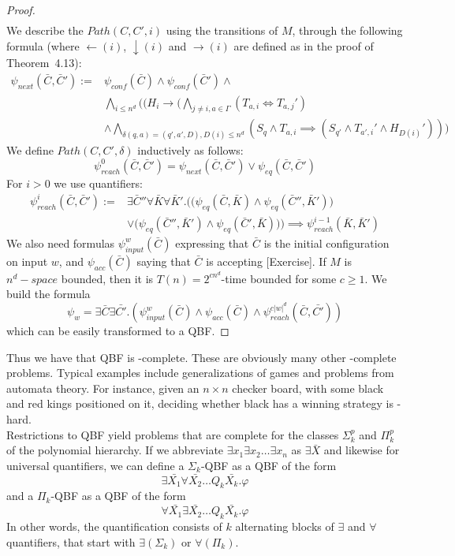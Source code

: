 \documentclass{report}
\newcommand{\PSpace}{\text{$\mathit{PSpace}$}\xspace}
\begin{document}
\begin{proof}
\begin{align*}
\end{align*}
We describe the $Path(C,C',i)$ using the transitions of $M$, through the following formula (where $\leftarrow(i)$, $\downarrow(i)$ and $\rightarrow(i)$ are defined as in the proof of Theorem~4.13):
\begin{align*}
 \psi_{\mathit{next}}(\bar{C}, \bar{C}') := {}& \psi_{\mathit{conf}}(\bar{C}) \land \psi_{\mathit{conf}}(\bar{C}') \land {} \\
 & \bigwedge_{i \leq n^d} \big( (H_i \to ( \bigwedge_{j \neq i, a \in \Gamma} ( T_{a,i} \iff T_{a,j}' ) \\
 & \land \bigwedge_{\delta(q,a) = (q',a',D), D(i) \leq n^d} ( S_q \land T_{a,i} \implies (S_{q'} \land T_{a',i}' \land H_{D(i)}')) \big)
\end{align*}
We define $Path(C,C',\delta)$ inductively as follows:
\[ \psi^0_{\mathit{reach}}(\bar{C},\bar{C}') = \psi_{\mathit{next}}(\bar{C},\bar{C}') \lor \psi_{\mathit{eq}}(\bar{C},\bar{C}') \]
For $ i > 0$ we use quantifiers:
\begin{align*}
 \psi_{\mathit{reach}}^i(\bar{C},\bar{C}') := & \exists \bar{C}'' \forall \bar{K} \forall \bar{K}'.
  \Big( \big( \psi_{\mathit{eq}}(\bar{C},\bar{K}) \land \psi_{\mathit{eq}}(\bar{C}'',\bar{K}')\big) \\
  & \lor \big( \psi_{\mathit{eq}}(\bar{C}'', \bar{K}') \land \psi_{\mathit{eq}}(\bar{C}',\bar{K})\big)\Big) \implies 
  \psi_{\mathit{reach}}^{i-1}(\bar{K},\bar{K}')
\end{align*}
We also need formulas $\psi_{input}^w(\bar{C})$ expressing that $\bar{C}$ is the initial configuration on input $w$, and $\psi_{acc}(\bar{C})$ saying that $\bar{C}$ is accepting [Exercise]. If $M$ is $n^d-space$ bounded, then it is $T(n)=2^{cn^d}$-time bounded for some $c \geq 1$. We build the formula
\[\psi_w = \exists \bar{C} \exists \bar{C'}.(\psi_{input}^w(\bar{C}) \land \psi_{acc}(\bar{C}) \land \psi_{reach}^{c|w|^d}(\bar{C},\bar{C'}))\]
which can be easily transformed to a QBF.
\end{proof}

Thus we have that QBF is \PSpace-complete. These are obviously many other \PSpace-complete problems. Typical examples include generalizations of games and problems from automata theory. For instance, given an $n\times n$ checker board, with some black and red kings positioned on it, deciding whether black has a winning strategy is \PSpace-hard.\\
Restrictions to QBF yield problems that are complete for the classes $\Sigma_k^p$ and $\Pi_k^p$ of the polynomial hierarchy. If we abbreviate $\exists x_1\exists x_2\dots\exists x_n$ as $\exists \bar{X}$ and likewise for universal quantifiers, we can define a $\Sigma_k$-QBF as a QBF of the form
\[ \exists \bar{X_1}\forall\bar{X_2}\dots Q_k\bar{X_k}.\varphi \]
and a $\Pi_k$-QBF as a QBF of the form
\[ \forall\bar{X_1}\exists\bar{X_2}\dots Q_k\bar{X_k}.\varphi \]
In other words, the quantification consists of $k$ alternating blocks of $\exists$ and $\forall$ quantifiers, that start with $\exists(\Sigma_k)$ or $\forall(\Pi_k)$.
\end{document}
